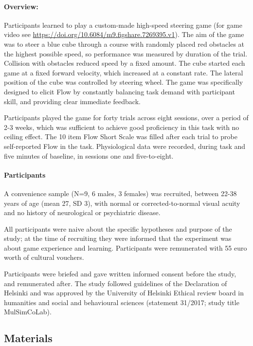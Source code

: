 
\paragraph{Overview:}
Participants learned to play a custom-made high-speed steering game (for game video see \url{https://doi.org/10.6084/m9.figshare.7269395.v1}). The aim of the game was to steer a blue cube through a course with randomly placed red obstacles at the highest possible speed, so performance was measured by duration of the trial. Collision with obstacles reduced speed by a fixed amount. The cube started each game at a fixed forward velocity, which increased at a constant rate. The lateral position of the cube was controlled by steering wheel. The game was specifically designed to elicit Flow by constantly balancing task demand with participant skill, and providing clear immediate feedback.

Participants played the game for forty trials across eight sessions, over a period of 2-3 weeks, which was sufficient to achieve good proficiency in this task with no ceiling effect. The 10 item Flow Short Scale \cite{Engeser2008} was filled after each trial to probe self-reported Flow in the task. Physiological data were recorded, during task and five minutes of baseline, in sessions one and five-to-eight.


\paragraph{Participants}
A convenience sample (N=9, 6 males, 3 females) was recruited, between 22-38 years of age (mean 27, SD 3), with normal or corrected-to-normal visual acuity and no history of neurological or psychiatric disease.

All participants were naive about the specific hypotheses and purpose of the study; at the time of recruiting they were informed that the experiment was about game experience and learning. Participants were remunerated with 55 euro worth of cultural vouchers.

Participants were briefed and gave written informed consent before the study, and remunerated after. The study followed guidelines of the Declaration of Helsinki and was approved by the University of Helsinki Ethical review board in humanities and social and behavioural sciences (statement 31/2017; study title MulSimCoLab).

\subsection*{Materials}
